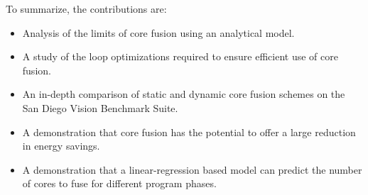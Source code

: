 To summarize, the contributions are:

\begin{itemize}
\item Analysis of the limits of core fusion using an analytical model.
\vspace{-1em}
\item A study of the loop optimizations required to ensure efficient use of core fusion.
\vspace{-2.5em}
\item An in-depth comparison of static and dynamic core fusion schemes on the San Diego Vision Benchmark Suite.
\vspace{-1em}
\item A demonstration that core fusion has the potential to offer a large reduction in energy savings.
\vspace{-1em}
\item A demonstration that a linear-regression based model can predict the number of cores to fuse for different program phases.
\end{itemize}




